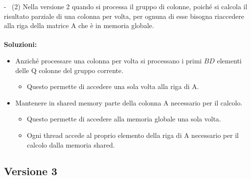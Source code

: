 \documentclass[compress]{beamer}
\begin{document}
\begin{frame}{\secname \text{ }- \subsecname\ (2)}
    Nella versione 2 quando si processa il gruppo di colonne, poiché si calcola il risultato parziale di una colonna per volta, per ognuna di esse bisogna riaccedere alla riga della matrice A che è in memoria globale. \\ \\
    
    \textbf{Soluzioni:} \\
    \begin{itemize}
        \item Anziché processare una colonna per volta si processano i primi $BD$ elementi delle Q colonne del gruppo corrente.
        \begin{itemize}
            \item Questo permette di accedere una sola volta alla riga di A.
        \end{itemize}
        \item Mantenere in shared memory parte della colonna A necessario per il calcolo.
        \begin{itemize}
            \item Questo permette di accedere alla memoria globale una sola volta.
            \item Ogni thread accede al proprio elemento della riga di A necessario per il calcolo dalla memoria shared.
        \end{itemize}
    \end{itemize}
\end{frame}

\subsection{Versione 3}
\end{document}
